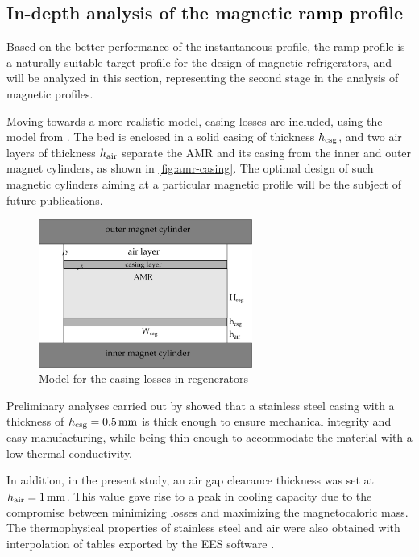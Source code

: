 \documentclass[referee]{svjour3}
\begin{document}
\subsection{In-depth analysis of the  magnetic \textcolor{black}{ramp} profile}
\label{sec:performance-an-amr-1}

Based on the better performance of the instantaneous profile, the ramp profile is a naturally suitable target profile for the design of magnetic refrigerators, and will be analyzed in this section, representing the second stage in the analysis of magnetic profiles.

Moving towards a more realistic model, casing losses are included, using the model from \cite{bib:trevizoli16_perfor_model}. The bed is enclosed in a solid casing of thickness $h_{\mathrm{csg}}$, and two air layers of thickness $h_{\mathrm{air}}$ separate the AMR and its casing from the inner and outer magnet cylinders, as shown in \autoref{fig:amr-casing}. The optimal design of such magnetic cylinders aiming at a particular magnetic profile  will be the subject of future publications. 

\begin{figure}[!ht]
  \centering
  \includegraphics[width=7cm]{Fig12-amr-casing}
  \caption{Model for the casing losses in regenerators}
  \label{fig:amr-casing}
\end{figure}


Preliminary analyses carried out by \cite{bib:peixer17-perfor-amrs} showed that a stainless steel casing with a thickness of $h\ped{csg} = \SI{0.5}{\mm}$ is thick enough to ensure mechanical integrity and easy manufacturing, while being thin enough to accommodate the material with a low thermal conductivity.

In addition, in the present study, an air gap clearance thickness was set at $h\ped{air} = \SI{1}{\mm}$. This value gave rise to a peak in cooling capacity due to the compromise between minimizing losses and maximizing the magnetocaloric mass.  The thermophysical properties of stainless steel and air were also obtained with interpolation of tables exported by the EES software \cite{bib:klein13-ees}.
\end{document}
